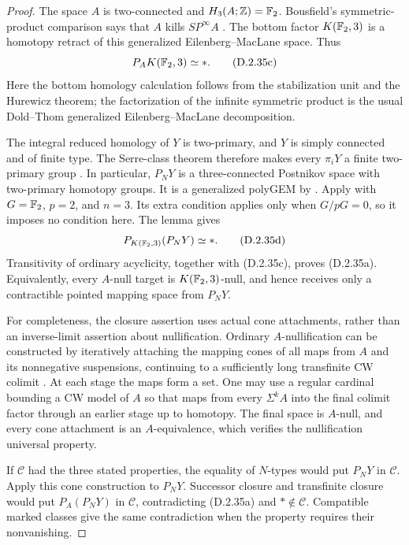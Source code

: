 \begin{proof}
The space $A$ is two-connected and $H_3(A;\mathbb Z)=\mathbb F_2$.
Bousfield's symmetric-product comparison says that $A$ kills
$SP^\infty A$ \cite[Corollary~3.2(ii), p.~39]{Bousfield1996ULP}.
The bottom factor $K(\mathbb F_2,3)$ is a homotopy retract of this
generalized Eilenberg--MacLane space. Thus
\[
                         P_AK(\mathbb F_2,3)\simeq *.
                         \tag{D.2.35c}
\]
Here the bottom homology calculation follows from the
stabilization unit and the Hurewicz theorem; the factorization
of the infinite symmetric product is the usual Dold--Thom
generalized Eilenberg--MacLane decomposition.

The integral reduced homology of $Y$ is two-primary, and $Y$
is simply connected and of finite type. The Serre-class theorem
therefore makes every $\pi_iY$ a finite two-primary group
\cite[Chapter~III, Theorem~1 and Corollaries~1--2,
pp.~272--274]{I_SerreClasses1953}. In particular, $P_NY$ is a
three-connected Postnikov space with two-primary homotopy
groups. It is a generalized polyGEM by
\cite[Proposition~8.5, p.~1340]{EH5Bousfield1997}.
Apply \cite[Lemma~8.13, p.~1341]{EH5Bousfield1997} with
$G=\mathbb F_2$, $p=2$, and $n=3$. Its extra condition applies
only when $G/pG=0$, so it imposes no condition here. The lemma
gives
\[
                    P_{K(\mathbb F_2,3)}(P_NY)\simeq *.
                    \tag{D.2.35d}
\]
Transitivity of ordinary acyclicity, together with
\textup{(D.2.35c)}, proves \textup{(D.2.35a)}. Equivalently,
every $A$-null target is $K(\mathbb F_2,3)$-null, and hence receives
only a contractible pointed mapping space from $P_NY$.

For completeness, the closure assertion uses actual cone
attachments, rather than an inverse-limit assertion about
nullification. Ordinary $A$-nullification can be constructed
by iteratively attaching the mapping cones of all maps from
$A$ and its nonnegative suspensions, continuing to a
sufficiently long transfinite CW colimit
\cite[Theorem~1.1 and the following construction, p.~34]
     {Bousfield1996ULP}.
At each stage the maps form a set. One may use a regular
cardinal bounding a CW model of $A$ so that maps from every
$\Sigma^kA$ into the final colimit factor through an earlier
stage up to homotopy. The final space is $A$-null, and every
cone attachment is an $A$-equivalence, which verifies the
nullification universal property.

If $\mathcal C$ had the three stated properties, the equality
of $N$-types would put $P_NY$ in $\mathcal C$. Apply this cone
construction to $P_NY$. Successor closure and transfinite
closure would put $P_A(P_NY)$ in $\mathcal C$, contradicting
\textup{(D.2.35a)} and $*\notin\mathcal C$. Compatible marked
classes give the same contradiction when the property requires
their nonvanishing.


\end{proof}
